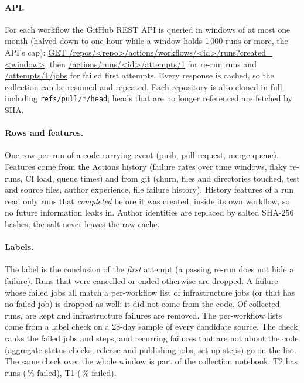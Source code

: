 \documentclass[11pt,a4paper]{article}
\begin{document}
\paragraph{API.} For each workflow the GitHub REST API is queried in windows of at
most one month (halved down to one hour while a window holds 1\,000 runs or more,
the API's cap):
\url{GET /repos/<repo>/actions/workflows/<id>/runs?created=<window>},
then \url{/actions/runs/<id>/attempts/1} for re-run runs and
\url{/attempts/1/jobs} for failed first attempts. Every response is cached, so
the collection can be resumed and repeated. Each repository is also cloned in full,
including \texttt{refs/pull/*/head}; heads that are no longer referenced are
fetched by SHA.

\paragraph{Rows and features.} One row per run of a code-carrying event (push, pull
request, merge queue). Features come from the Actions history (failure rates over
time windows, flaky re-runs, CI load, queue times) and from git (churn, files and
directories touched, test and source files, author experience, file failure
history). History features of a run read only runs that \emph{completed} before it
was created, inside its own workflow, so no future information leaks in. Author
identities are replaced by salted SHA-256 hashes; the salt never leaves the raw
cache.

\paragraph{Labels.} The label is the conclusion of the \emph{first} attempt
(a passing re-run does not hide a failure). Runs that were cancelled or ended
otherwise are dropped. A failure whose failed jobs all match a per-workflow list
of infrastructure jobs (or that has no failed job) is dropped as well: it did not
come from the code. Of \RunsCollected{} collected runs, \RunsKept{} are kept and
\InfraDropped{} infrastructure failures are removed. The per-workflow lists come
from a label check on a 28-day sample of every candidate source. The check ranks
the failed jobs and steps, and recurring failures that are not about the code
(aggregate status checks, release and publishing jobs, set-up steps) go on the list. The same check over the whole
window is part of the collection notebook. T2 has \RowsTwo{} runs
(\FailPctTwo\,\% failed), T1 \RowsOne{} (\FailPctOne\,\% failed).
\end{document}
